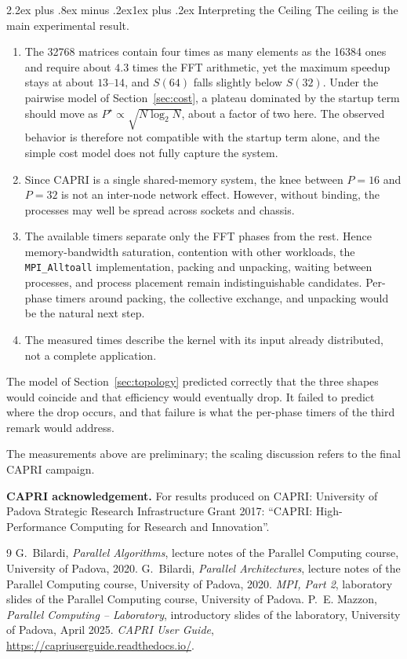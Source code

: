 \documentclass[conference,onecolumn]{IEEEtran}
\makeatletter
\renewcommand{\subsection}{\@startsection{subsection}{2}{\z@}%
  {2.2ex plus .8ex minus .2ex}{1ex plus .2ex}%
  {\normalfont\normalsize\bfseries}}
\theoremstyle{course}
\newif\ifFinalCampaign
\makeatother
\begin{document}
\subsection{Interpreting the Ceiling}
The ceiling is the main experimental result.
\begin{enumerate}
\item The 32768 matrices contain four times as many elements as the 16384
ones and require about $4.3$ times the FFT arithmetic, yet the maximum
speedup stays at about $13$--$14$, and $S(64)$ falls slightly below
$S(32)$. Under the pairwise model of Section~\ref{sec:cost}, a plateau
dominated by the startup term should move as $P^\star\propto\sqrt{N\log_2 N}$, about
a factor of two here. The observed behavior is therefore not compatible
with the startup term alone, and the simple cost model does not fully
capture the system.
\item Since CAPRI is a single shared-memory system, the knee between $P=16$
and $P=32$ is not an inter-node network effect. However, without binding,
the processes may well be spread across sockets and chassis.
\item The available timers separate only the FFT phases from the rest.
Hence memory-bandwidth saturation, contention with other workloads, the
\texttt{MPI\_Alltoall} implementation, packing and unpacking, waiting
between processes, and process placement remain indistinguishable
candidates.
Per-phase timers around packing, the collective exchange, and unpacking
would be the natural next step.
\item The measured times describe the kernel with its input already
distributed, not a complete application.
\end{enumerate}
The model of Section~\ref{sec:topology} predicted correctly that the three
shapes would coincide and that efficiency would eventually drop. It failed
to predict where the drop occurs, and that failure is what the per-phase
timers of the third remark would address.
\ifFinalCampaign\else
The measurements above are preliminary; the scaling discussion refers to the
final CAPRI campaign.
\fi

\medskip
\textbf{CAPRI acknowledgement.}
For results produced on CAPRI: University of Padova Strategic Research
Infrastructure Grant 2017: ``CAPRI: High-Performance Computing for Research
and Innovation''.

\begin{thebibliography}{9}
 G.~Bilardi, \emph{Parallel Algorithms}, lecture notes of the
Parallel Computing course, University of Padova, 2020.
 G.~Bilardi, \emph{Parallel Architectures}, lecture notes of
the Parallel Computing course, University of Padova, 2020.
 \emph{MPI, Part 2}, laboratory slides of the Parallel
Computing course, University of Padova.
 P.~E. Mazzon, \emph{Parallel Computing -- Laboratory},
introductory slides of the laboratory, University of Padova, April 2025.
 \emph{CAPRI User Guide},
\url{https://capriuserguide.readthedocs.io/}.
\end{thebibliography}
\end{document}
